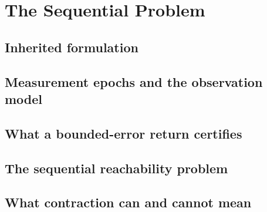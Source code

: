 
\section{The Sequential Problem}
\label{p2:sec:sequential}

\subsection{Inherited formulation}
\label{p2:sub:inherited_formulation}

\subsection{Measurement epochs and the observation model}
\label{p2:sub:measurement_epochs}

\subsection{What a bounded-error return certifies}
\label{p2:sub:what_a_return_certifies}

\subsection{The sequential reachability problem}
\label{p2:sub:sequential_reachability_problem}

\subsection{What contraction can and cannot mean}
\label{p2:sub:what_contraction_can_mean}
